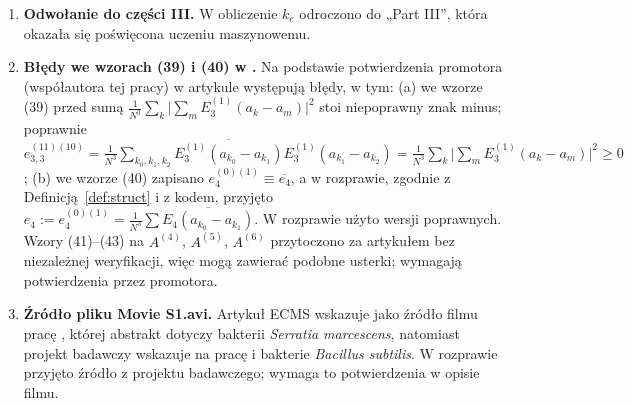 \documentclass[12pt,a4paper,twoside,openright]{report}
\theoremstyle{definition}
\theoremstyle{remark}
\begin{document}
\begin{enumerate}[nosep]
\item \textbf{Odwołanie do części III.} W \cite{czapla2025computational} obliczenie $k_e$ odroczono do „Part III”, która okazała się poświęcona uczeniu maszynowemu.
\item \textbf{Błędy we wzorach (39) i (40) w \cite{czapla2025computational}.} Na podstawie potwierdzenia promotora (współautora tej pracy) w artykule występują błędy, w tym: (a) we wzorze (39) przed sumą $\frac1{N^3}\sum_k\bigl|\sum_m E_3^{(1)}(a_k-a_m)\bigr|^2$ stoi niepoprawny znak minus; poprawnie $e_{3,3}^{(11)(10)}=\frac1{N^3}\sum_{k_0,k_1,k_2}\overline{E_3^{(1)}(a_{k_0}-a_{k_1})}E_3^{(1)}(a_{k_1}-a_{k_2})=\frac1{N^3}\sum_k\bigl|\sum_m E_3^{(1)}(a_k-a_m)\bigr|^2\ge0$; (b) we wzorze (40) zapisano $e_4^{(0)(1)}\equiv\overline{e_4}$, a w rozprawie, zgodnie z Definicją~\ref{def:struct} i z kodem, przyjęto $e_4:=e_4^{(0)(1)}=\frac1{N^3}\sum\overline{E_4(a_{k_0}-a_{k_1})}$. W rozprawie użyto wersji poprawnych. Wzory (41)--(43) na $A^{(4)}$, $A^{(5)}$, $A^{(6)}$ przytoczono za artykułem bez niezależnej weryfikacji, więc mogą zawierać podobne usterki; wymagają potwierdzenia przez promotora.
\item \textbf{Źródło pliku Movie S1.avi.} Artykuł ECMS \cite{ligocki2025study} wskazuje jako źródło filmu pracę \cite{ariel2018collective}, której abstrakt dotyczy bakterii \emph{Serratia marcescens}, natomiast projekt badawczy wskazuje na pracę \cite{ryan2013kinetic} i bakterie \emph{Bacillus subtilis}. W rozprawie przyjęto źródło z projektu badawczego; wymaga to potwierdzenia w opisie filmu.


\end{enumerate}
\end{document}
